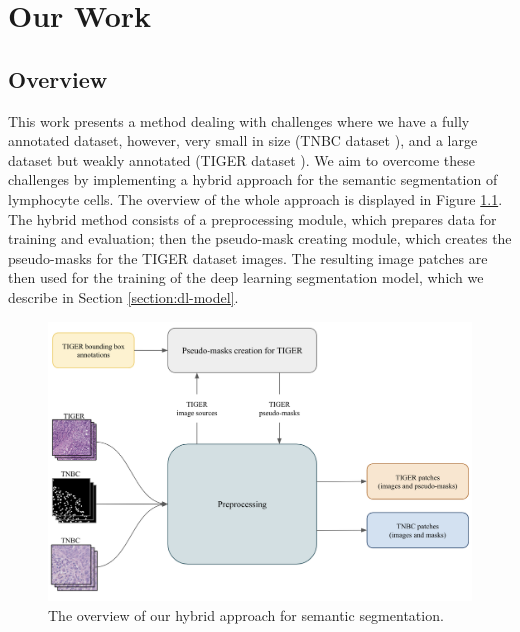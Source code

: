 \chapter{Our Work}
\label{chap:prelim-exp}

\section{Overview}
This work presents a method dealing with challenges where we have a fully annotated dataset, however, very small in size (TNBC dataset \cite{TNBC-nuclei-seg-extended}), and a large dataset but weakly annotated (TIGER dataset \cite{tiger_dataset}). We aim to overcome these challenges by implementing a hybrid approach for the semantic segmentation of lymphocyte cells. The overview of the whole approach is displayed in Figure \ref{fig:dg-overview}. The hybrid method consists of a preprocessing module, which prepares data for training and evaluation; then the pseudo-mask creating module, which creates the pseudo-masks for the TIGER dataset images. The resulting image patches are then used for the training of the deep learning segmentation model, which we describe in Section \ref{section:dl-model}.

\begin{figure}[H]
\begin{centering}
\includegraphics[width=\textwidth]{assets/images/for_presentation/dg-overview.png}
\par\end{centering}
\caption{The overview of our hybrid approach for semantic segmentation. 
\label{fig:dg-overview}}
\end{figure}

